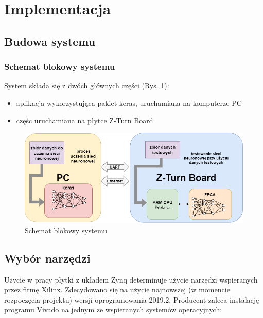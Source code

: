 \newpage %
\cleardoublepage %
\pagestyle{headings}

\section{Implementacja}

\subsection{Budowa systemu}

\subsubsection{Schemat blokowy systemu}

System składa się z dwóch głównych części (Rys. \ref{schemat_blokowy}):
\begin{itemize}
  \item aplikacja wykorzystująca pakiet keras, uruchamiana na komputerze PC
  \item częśc uruchamiana na płytce Z-Turn Board
\end{itemize}

\begin{figure}[h]
  \centering
  \includegraphics[width=\textwidth]{img/schemat_blokowy.png}
  \caption{Schemat blokowy systemu}
  \label{schemat_blokowy}
\end{figure}

\subsection{Wybór narzędzi}

Użycie w pracy płytki z układem Zynq determinuje użycie narzędzi wspieranych 
przez firmę Xilinx. Zdecydowano się na użycie najnowszej (w momencie rozpoczęcia 
projektu) wersji oprogramowania 2019.2. Producent zaleca\cite{VivadoGuide} instalację 
programu Vivado na jednym ze wspieranych systemów operacyjnych:

